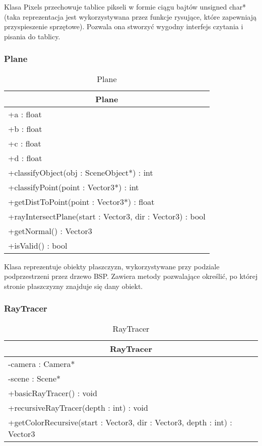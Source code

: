 Klasa Pixels przechowuje tablice pikseli w formie ciągu bajtów unsigned char* (taka reprezentacja jest wykorzystywana przez funkcje rysujące, które zapewniają przyspieszenie sprzętowe). Pozwala ona stworzyć wygodny interfejs czytania i pisania do tablicy. 

\subsubsection{Plane}

\footnotesize
\begin{longtable}{|p{14cm}|}
    \caption{Plane} \label{tab:Plane} \\ \hline
    \multicolumn{1}{|c|}{Plane} \\ \hline
    +a : float \\ 
    +b : float \\
    +c : float \\
    +d : float \\
    \hline
	+classifyObject(obj : SceneObject*) : int \\
	+classifyPoint(point : Vector3*) : int \\
	+getDistToPoint(point : Vector3*) : float \\
	+rayIntersectPlane(start : Vector3, dir : Vector3) : bool \\
	+getNormal() : Vector3 \\
	+isValid() : bool \\
	\hline
\end{longtable}
\normalsize

Klasa reprezentuje obiekty płaszczyzn, wykorzystywane przy podziale podprzestrzeni przez drzewo BSP. Zawiera metody pozwalające określić, po której stronie płaszczyzny znajduje się dany obiekt.

\subsubsection{RayTracer}

\footnotesize
\begin{longtable}{|p{14cm}|}
    \caption{RayTracer} \label{tab:RayTracer} \\ \hline
    \multicolumn{1}{|c|}{RayTracer} \\ \hline
    -camera : Camera* \\
    -scene : Scene* \\ \hline
	+basicRayTracer() : void \\
	+recursiveRayTracer(depth : int) : void \\
	+getColorRecursive(start : Vector3, dir : Vector3, depth : int) : Vector3 \\
	\hline
\end{longtable}
\normalsize


